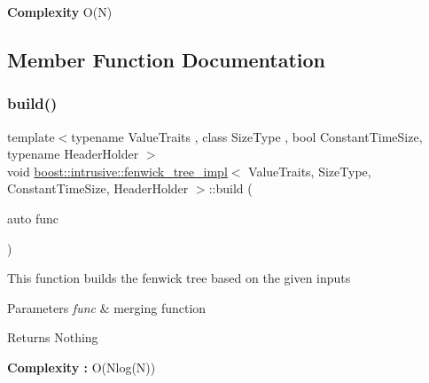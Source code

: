 {\bfseries  Complexity } O(\+N) 

\subsection{Member Function Documentation}
\mbox{\label{classboost_1_1intrusive_1_1fenwick__tree__impl_a77c1686e0488c841133aefcf7992b29c}} 
\subsubsection{\texorpdfstring{build()}{build()}}
{\footnotesize\ttfamily template$<$typename Value\+Traits , class Size\+Type , bool Constant\+Time\+Size, typename Header\+Holder $>$ \\
void \hyperlink{classboost_1_1intrusive_1_1fenwick__tree__impl}{boost\+::intrusive\+::fenwick\+\_\+tree\+\_\+impl}$<$ Value\+Traits, Size\+Type, Constant\+Time\+Size, Header\+Holder $>$\+::build (\begin{DoxyParamCaption}\item[{auto}]{func }\end{DoxyParamCaption})\hspace{0.3cm}{\ttfamily [inline]}}

This function builds the fenwick tree based on the given inputs 
\begin{DoxyParams}{Parameters}
{\em func} & merging function \\
\hline
\end{DoxyParams}
\begin{DoxyReturn}{Returns}
Nothing 
\end{DoxyReturn}


{\bfseries Complexity \+: } O(\+Nlog(\+N)) \mbox{\label{classboost_1_1intrusive_1_1fenwick__tree__impl_a47f1c138ed862fc41b178ca30478e0f9}} 
